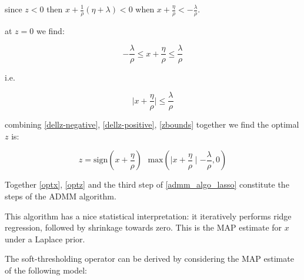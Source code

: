 \begin{example}[LASSO]
since \(z<0\) then \(x + \frac{1}{\rho} ( \eta + \lambda ) < 0\) when \(x + \frac{\eta}{\rho} < - \frac{\lambda}{\rho}\).

at \(z=0\) we find:

\begin{equation*}
-\frac{\lambda}{\rho} \leq x + \frac{\eta}{\rho} \leq \frac{\lambda}{\rho}
\end{equation*}

i.e.

\begin{equation}
\mid x+ \frac{\eta}{\rho}\mid \leq \frac{\lambda}{\rho}
\label{zbounds}
\end{equation}

combining \eqref{dellz-negative}, \eqref{dellz-positive}, \eqref{zbounds} together we find the optimal \(z\) is:

\begin{equation}
z = \mathrm{sign}(x+\frac{\eta}{\rho})\text{ }\mathrm{max}\left( \mid x+\frac{\eta}{\rho} \mid - \frac{\lambda}{\rho} ,0\right)
\label{optz}
\end{equation}

Together \eqref{optx}, \eqref{optz} and the third step of \eqref{admm_algo_lasso} constitute the steps of the ADMM algorithm.

\end{example}

This algorithm has a nice statistical interpretation: it iteratively performs ridge regression, followed by shrinkage towards zero. This is the MAP estimate for \(x\) under a Laplace prior.

The soft-thresholding operator can be derived by considering the MAP estimate of the following model:

